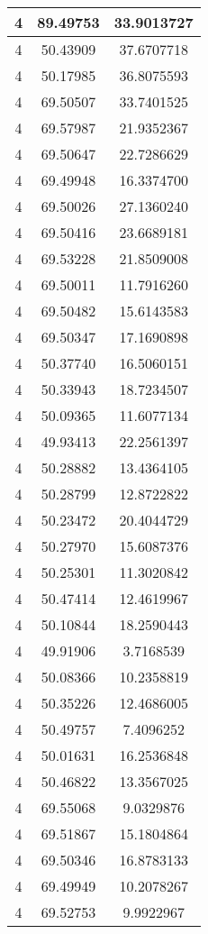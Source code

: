 \documentclass[
]{book}
\begin{document}
\begin{tabular}{c|c|c}
\hline
4 & 89.49753 & 33.9013727\\
\hline
4 & 50.43909 & 37.6707718\\
\hline
4 & 50.17985 & 36.8075593\\
\hline
4 & 69.50507 & 33.7401525\\
\hline
4 & 69.57987 & 21.9352367\\
\hline
4 & 69.50647 & 22.7286629\\
\hline
4 & 69.49948 & 16.3374700\\
\hline
4 & 69.50026 & 27.1360240\\
\hline
4 & 69.50416 & 23.6689181\\
\hline
4 & 69.53228 & 21.8509008\\
\hline
4 & 69.50011 & 11.7916260\\
\hline
4 & 69.50482 & 15.6143583\\
\hline
4 & 69.50347 & 17.1690898\\
\hline
4 & 50.37740 & 16.5060151\\
\hline
4 & 50.33943 & 18.7234507\\
\hline
4 & 50.09365 & 11.6077134\\
\hline
4 & 49.93413 & 22.2561397\\
\hline
4 & 50.28882 & 13.4364105\\
\hline
4 & 50.28799 & 12.8722822\\
\hline
4 & 50.23472 & 20.4044729\\
\hline
4 & 50.27970 & 15.6087376\\
\hline
4 & 50.25301 & 11.3020842\\
\hline
4 & 50.47414 & 12.4619967\\
\hline
4 & 50.10844 & 18.2590443\\
\hline
4 & 49.91906 & 3.7168539\\
\hline
4 & 50.08366 & 10.2358819\\
\hline
4 & 50.35226 & 12.4686005\\
\hline
4 & 50.49757 & 7.4096252\\
\hline
4 & 50.01631 & 16.2536848\\
\hline
4 & 50.46822 & 13.3567025\\
\hline
4 & 69.55068 & 9.0329876\\
\hline
4 & 69.51867 & 15.1804864\\
\hline
4 & 69.50346 & 16.8783133\\
\hline
4 & 69.49949 & 10.2078267\\
\hline
4 & 69.52753 & 9.9922967\\

\end{tabular}
\end{document}
